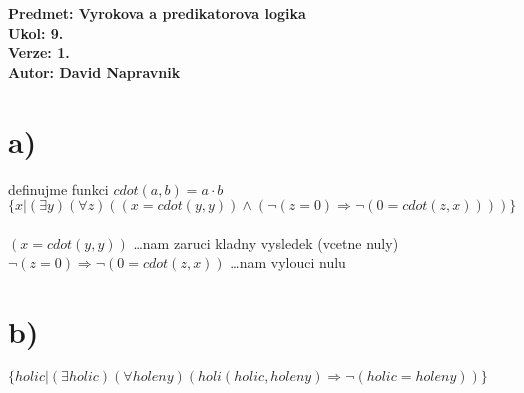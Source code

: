 \documentclass[a4paper]{article}
\begin{document}
\noindent
\textbf{Predmet: Vyrokova a predikatorova logika}\\
\textbf{Ukol: 9.}\\
\textbf{Verze: 1.}\\
\textbf{Autor: David Napravnik}


\section*{a)}
definujme funkci $cdot(a,b) = a \cdot b$\\
$
\{x |
	(\exists y)
	(\forall z)
	(
		(x=cdot(y,y))
		\wedge
		(
			\neg(z=0)
			\Rightarrow
			\neg(0=cdot(z,x))
		)
	)
\}
$\\\\
$(x=cdot(y, y))$ \dots nam zaruci kladny vysledek (vcetne nuly)\\
$\neg(z=0)\Rightarrow\neg(0=cdot(z,x))$ \dots nam vylouci nulu



\section*{b)}
$
\{holic |
	(\exists holic)
	(\forall holeny)
	(
		holi(holic, holeny)
		\Rightarrow
		\neg(holic = holeny)
	)
\}
$
\end{document}
